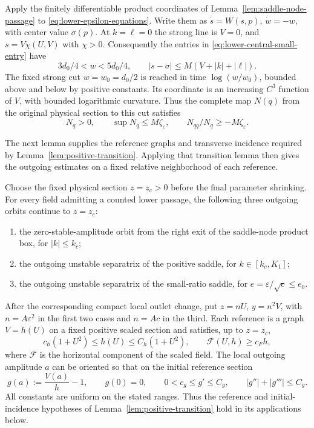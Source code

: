 Apply the finitely differentiable product coordinates of
Lemma~\ref{lem:saddle-node-passage} to \eqref{eq:lower-epsilon-equations}.
Write them as $\dot s=W(s,p)$, $\dot w=-w$, with center value
$\sigma(p)$. At $k=\ell=0$ the strong line is $V=0$, and
$s=V\chi(U,V)$ with $\chi>0$. Consequently the entries in
\eqref{eq:lower-central-small-entry} have
\[
 3d_0/4<w<5d_0/4,\qquad |s-\sigma|\le M(V+|k|+|\ell|).
\]
The fixed strong cut $w=w_0=d_0/2$ is reached in time
$\log(w/w_0)$, bounded above and below by positive constants. Its
coordinate is an increasing $C^3$ function of $V$, with bounded
logarithmic curvature. Thus the complete map $N(q)$ from the original
physical section to this cut satisfies
\begin{equation}\label{eq:lower-central-complement}
 N_q>0,\qquad \sup N_q\le M\zeta_\varepsilon,\qquad
 N_{qq}/N_q\ge-M\zeta_\varepsilon .
\end{equation}

The next lemma supplies the reference graphs and transverse incidence
required by Lemma~\ref{lem:positive-transition}. Applying that transition
lemma then gives the outgoing estimates on a fixed relative neighborhood
of each reference.

\begin{lemma}\label{lem:lower-positive-references}
Choose the fixed physical section $z=z_c>0$ before the final parameter
shrinking.  For every field admitting a counted lower passage, the
following three outgoing orbits continue to $z=z_c$:
\begin{enumerate}
 \item the zero-stable-amplitude orbit from the right exit of the
       saddle-node product box, for $|k|\le k_c$;
 \item the outgoing unstable separatrix of the positive saddle, for
       $k\in[k_c,K_1]$;
 \item the outgoing unstable separatrix of the small-ratio saddle, for
       $e=\varepsilon/\sqrt c\le e_0$.
\end{enumerate}
After the corresponding compact local outlet change, put
$z=nU$, $y=n^2V$, with $n=A\varepsilon^2$ in the first two cases and
$n=Ac$ in the third.  Each reference is a graph $V=h(U)$ on a fixed
positive scaled section and satisfies, up to $z=z_c$,
\begin{equation}\label{eq:lower-positive-reference-bounds}
 c_h(1+U^2)\le h(U)\le C_h(1+U^2),\qquad
 \mathcal F(U,h)\ge c_Fh,
\end{equation}
where $\mathcal F$ is the horizontal component of the scaled field.
The local outgoing amplitude $a$ can be oriented so that on the initial
reference section
\begin{equation}\label{eq:lower-positive-reference-incidence}
 g(a):=\frac{V(a)}{h}-1,\qquad g(0)=0,\qquad
 0<c_g\le g'\le C_g,\qquad |g''|+|g'''|\le C_g.
\end{equation}
All constants are uniform on the stated ranges.  Thus the reference and
initial-incidence hypotheses of Lemma~\ref{lem:positive-transition}
hold in its applications below.
\end{lemma}


